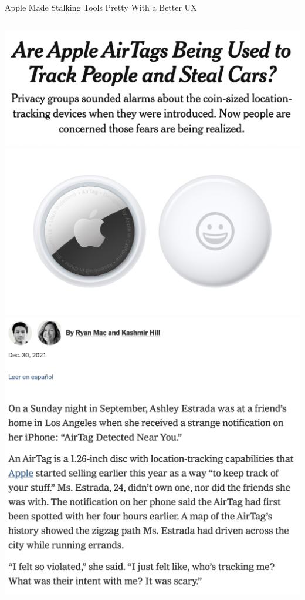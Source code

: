 \documentclass[nobackground,dvipsnames,table,aspectratio=169]{beamer}
\begin{document}
\begin{frame}{Apple Made Stalking Tools Pretty With a Better UX}
    \begin{columns}
            \includegraphics[width=\textwidth]{airtags-nyt-headline}
            \includegraphics[width=\textwidth]{airtags}
            \includegraphics[width=\textwidth]{airtags-nyt-article}
    \end{columns}
\end{frame}
\end{document}
